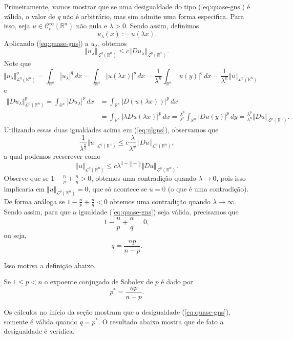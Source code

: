 \documentclass[a4paper, 11pt]{book}
\theoremstyle{definition}
\newcommand{\bR}{\mathbb{R}}
\newcommand{\cC}{\mathcal{C}}
\newcommand{\cL}{\mathcal{L}}
\begin{document}
Primeiramente, vamos mostrar que se uma desigualdade do tipo (\ref{eq:quase-gns}) é válida, o valor de $q$ não é arbitrário, mas sim admite uma forma especifica.
Para isso, seja $u \in \cC^\infty_c(\bR^n)$ não nula e $\lambda > 0$.
Sendo assim, definimos
\[
    u_\lambda(x) := u(\lambda x).
\]
Aplicando (\ref{eq:quase-gns}) a $u_\lambda$, obtemos
\begin{equation} \label{eq:ulgns}
    \Vert u_\lambda \Vert_{\cL^q(\bR^n)} \leqslant c \Vert Du_\lambda \Vert_{\cL^p(\bR^n)}.
\end{equation}
Note que
\[
    \Vert u_\lambda \Vert_{\cL^q(\bR^n)}^q = \int_{\bR^n} |u_\lambda|^q \,dx = \int_{\bR^n} |u(\lambda x)|^p \,dx = \frac{1}{\lambda^n} \int_{\bR^n} |u(y)|^q \,dx = \frac{1}{\lambda^n}\Vert u \Vert_{\cL^q(\bR^n)}
\]
e
\[
    \begin{aligned}
        \Vert Du_\lambda \Vert_{\cL^p(\bR^n)}^p = \int_{\bR^n} |Du_\lambda|^p \,dx &= \int_{\bR^n} |D(u(\lambda x))|^p \,dx \\
        &= \int_{\bR^n} |\lambda Du(\lambda x)|^p \,dx = \frac{\lambda^p}{\lambda^n} \int_{\bR^n} |Du(y)|^p \,dy = \frac{\lambda^p}{\lambda^n}\Vert Du \Vert_{\cL^p(\bR^n)}.
    \end{aligned}
\]
Utilizando essas duas igualdades acima em (\ref{eq:ulgns}), observamos que
\[
    \frac{1}{\lambda^{\frac{n}{q}}} \Vert u \Vert_{\cL^q(\bR^n)} \leqslant c \frac{\lambda}{\lambda^{\frac{n}{p}}}\Vert Du \Vert_{\cL^p(\bR^n)},
\]
a qual podemos reescrever como
\begin{equation}
    \Vert u \Vert_{\cL^q(\bR^n)} \leqslant c\lambda^{1 - \frac{n}{p}  + \frac{n}{q}}\Vert Du \Vert_{\cL^p(\bR^n)}.
\end{equation}
Observe que se $1 - \frac{n}{p} + \frac{n}{q} > 0$, obtemos uma contradição quando $\lambda \to 0$, pois isso implicaria em $\Vert u \Vert_{\cL^q(\bR^n)} = 0$,
que só acontece se $u = 0$ (o que é uma contradição).
De forma análoga se $1 - \frac{n}{p} + \frac{n}{q} < 0$ obtemos uma contradição quando $\lambda \to \infty$.
Sendo assim, para que a igualdade (\ref{eq:quase-gns}) seja válida, precisamos que
\[
    1 - \frac{n}{p} + \frac{n}{q} = 0,
\]
ou seja,
\[
    q = \frac{np}{n - p}.
\]

Isso motiva a definição abaixo.
\begin{dbox}
    Se $1 \leqslant p < n$ o expoente conjugado de Sobolev de $p$ é dado por
    \[
        p^* = \frac{np}{n - p}.
    \]
\end{dbox}

Os cálculos no início da seção mostram que a desigualdade (\ref{eq:quase-gns}), somente é válida quando $q = p^*$. O resultado abaixo mostra que de fato a desigualdade é verídica.
\end{document}

